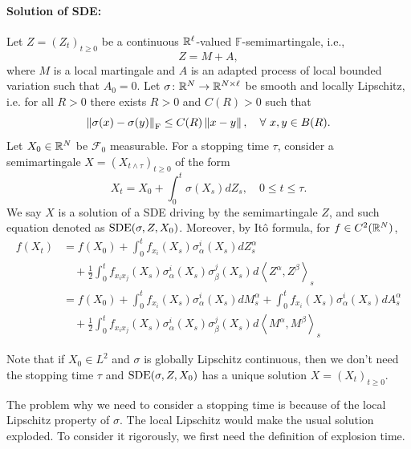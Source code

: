 \paragraph{Solution of SDE:} Let $Z = (Z_t)_{t \geq 0}$ be a continuous $\mathbb{R}^\ell$-valued $\mathbb{F}$-semimartingale, i.e.,
\begin{equation*}
	Z = M + A,
\end{equation*}
where $M$ is a local martingale and $A$ is an adapted process of local bounded variation such that $A_0 = 0$. Let $\sigma \colon \mathbb{R}^N \rightarrow \mathbb{R}^{N \times \ell}$ be smooth and locally Lipschitz, i.e. for all $R > 0$ there exists $R > 0$ and $C(R) > 0$ such that
\begin{equation*}
	\left\lVert\sigma(x) - \sigma(y)\right\lVert_{\operatorname{F}} \leq C(R)\left\lVert x - y\right\lVert,\quad \forall~x,y \in B(R).
\end{equation*}
Let $X_0 \in \mathbb{R}^N$ be $\mathcal{F}_0$ measurable. For a stopping time $\tau$, consider a semimartingale $X = (X_{t \wedge \tau})_{t \geq 0}$ of the form
\begin{equation*}
 	X_t = X_0 + \int_0^t \sigma(X_s) dZ_s,\quad 0 \leq t \leq \tau.
\end{equation*}
We say $X$ is a solution of a SDE driving by the semimartingale $Z$, and such equation denoted as $\operatorname{SDE}(\sigma,Z,X_0)$.  Moreover, by It\^o formula, for $f \in C^2(\mathbb{R}^N)$,
\begin{align*}
	f(X_t)& =f\left(X_0\right)+\int_0^t f_{x_i}\left(X_s\right) \sigma_\alpha^i\left(X_s\right) d Z_s^\alpha \\
	& \quad+\frac{1}{2} \int_0^t f_{x_i x_j}\left(X_s\right) \sigma_\alpha^i\left(X_s\right) \sigma_\beta^j\left(X_s\right) d\left\langle Z^\alpha, Z^\beta\right\rangle_s \\
	& =f\left(X_0\right)+\int_0^t f_{x_i}\left(X_s\right) \sigma_\alpha^i\left(X_s\right) d M_s^\alpha+\int_0^t f_{x_i}\left(X_s\right) \sigma_\alpha^i\left(X_s\right) d A_s^\alpha \\
	& \quad+\frac{1}{2} \int_0^t f_{x_i x_j}\left(X_s\right) \sigma_\alpha^i\left(X_s\right) \sigma_\beta^j\left(X_s\right) d\left\langle M^\alpha, M^\beta\right\rangle_s
\end{align*}
\begin{rmk}
    Note that if $X_0 \in L^2$ and $\sigma$ is globally Lipschitz continuous, then we don't need the stopping time $\tau$ and $\operatorname{SDE}(\sigma,Z,X_0)$ has a unique solution $X = (X_t)_{t \geq 0}$.
\end{rmk}

The problem why we need to consider a stopping time is because of the local Lipschitz property of $\sigma$. The local Lipschitz would make the usual solution exploded. To consider it rigorously, we first need the definition of explosion time.

